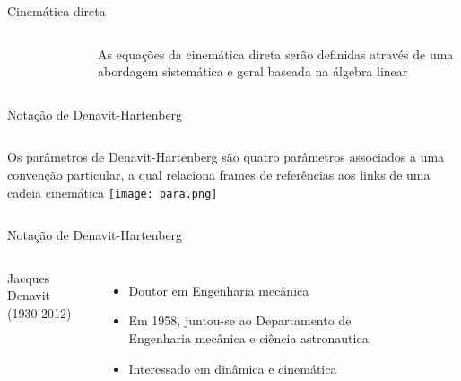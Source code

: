 \begin{frame}[t]{Cinemática direta} 
    \begin{columns}[c]
        \begin{figure}
        \end{figure} 
        As equações da cinemática direta serão definidas através de uma abordagem sistemática e geral baseada na álgebra linear 
    \end{columns}
\end{frame}
\begin{frame}[c]{Notação de Denavit-Hartenberg }
    \begin{columns}
        Os parâmetros de Denavit-Hartenberg são quatro 
        parâmetros associados a uma convenção particular, a qual relaciona frames de referências aos links de uma cadeia cinemática 
            \centering
            \texttt{[image: para.png]}
    \end{columns}
\end{frame}
\begin{frame}[t]{Notação de Denavit-Hartenberg} 
    
    \begin{columns}[c]
        Jacques Denavit (1930-2012)
        \begin{itemize}
            \item Doutor em Engenharia mecânica
            \item Em 1958, juntou-se ao Departamento de Engenharia
            mecânica e ciência astronautica
            \item Interessado em dinâmica e cinemática
              \end{itemize}
            \begin{figure}
            \end{figure}
    \end{columns}
\end{frame}
